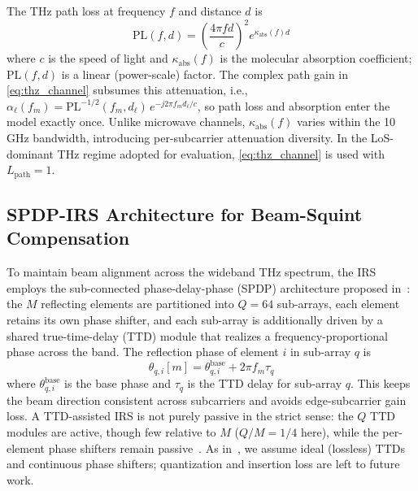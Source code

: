 \documentclass[10pt,conference]{IEEEtran}
\begin{document}

The THz path loss at frequency $f$ and distance $d$ is
\begin{equation}
\text{PL}(f, d) = \left(\frac{4\pi f d}{c}\right)^2 e^{\kappa_{\text{abs}}(f) d}
\label{eq:pathloss}
\end{equation}
where $c$ is the speed of light and $\kappa_{\text{abs}}(f)$ is the molecular absorption coefficient; $\text{PL}(f,d)$ is a linear (power-scale) factor. The complex path gain in \eqref{eq:thz_channel} subsumes this attenuation, i.e., $\alpha_\ell(f_m) = \text{PL}^{-1/2}(f_m, d_\ell)\, e^{-j2\pi f_m d_\ell / c}$, so path loss and absorption enter the model exactly once. Unlike microwave channels, $\kappa_{\text{abs}}(f)$ varies within the 10\,GHz bandwidth, introducing per-subcarrier attenuation diversity. In the LoS-dominant THz regime adopted for evaluation, \eqref{eq:thz_channel} is used with $L_{\text{path}}=1$.

\subsection{SPDP-IRS Architecture for Beam-Squint Compensation}

To maintain beam alignment across the wideband THz spectrum, the IRS employs the sub-connected phase-delay-phase (SPDP) architecture proposed in~\cite{su2023wideband}: the $M$ reflecting elements are partitioned into $Q = 64$ sub-arrays, each element retains its own phase shifter, and each sub-array is additionally driven by a shared true-time-delay (TTD) module that realizes a frequency-proportional phase across the band. The reflection phase of element $i$ in sub-array $q$ is
\begin{equation}
\theta_{q,i}[m] = \theta_{q,i}^{\text{base}} + 2\pi f_m \tau_q
\label{eq:spdp}
\end{equation}
where $\theta_{q,i}^{\text{base}}$ is the base phase and $\tau_q$ is the TTD delay for sub-array $q$. This keeps the beam direction consistent across subcarriers and avoids edge-subcarrier gain loss. A TTD-assisted IRS is not purely passive in the strict sense: the $Q$ TTD modules are active, though few relative to $M$ ($Q/M=1/4$ here), while the per-element phase shifters remain passive~\cite{su2023wideband}. As in~\cite{su2023wideband}, we assume ideal (lossless) TTDs and continuous phase shifters; quantization and insertion loss are left to future work.
\end{document}
